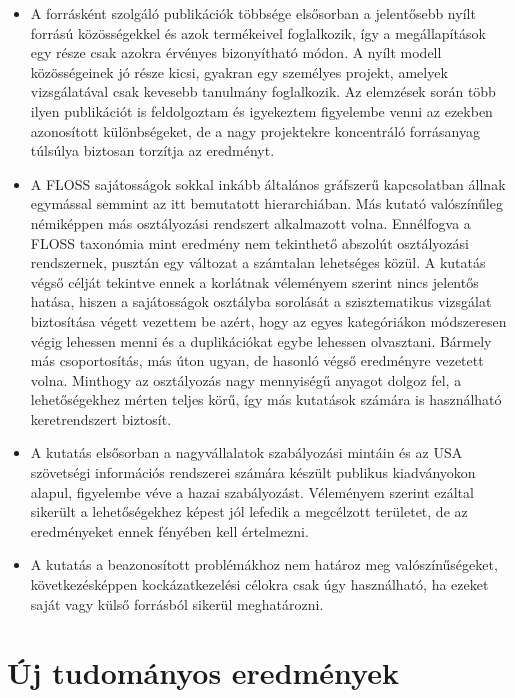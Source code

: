 \documentclass[12pt,magyar,a4paper,oneside]{scrreprt}
\begin{document}
\begin{itemize}
\item
  A forrásként szolgáló publikációk többsége elsősorban a jelentősebb
  nyílt forrású közösségekkel és azok termékeivel foglalkozik, így a
  megállapítások egy része csak azokra érvényes bizonyítható módon. A
  nyílt modell közösségeinek jó része kicsi, gyakran egy személyes
  projekt, amelyek vizsgálatával csak kevesebb tanulmány foglalkozik. Az
  elemzések során több ilyen publikációt is feldolgoztam és igyekeztem
  figyelembe venni az ezekben azonosított különbségeket, de a nagy
  projektekre koncentráló forrásanyag túlsúlya biztosan torzítja az
  eredményt.
\item
  A FLOSS sajátosságok sokkal inkább általános gráfszerű kapcsolatban
  állnak egymással semmint az itt bemutatott hierarchiában. Más kutató
  valószínűleg némiképpen más osztályozási rendszert alkalmazott volna.
  Ennélfogva a FLOSS taxonómia mint eredmény nem tekinthető abszolút
  osztályozási rendszernek, pusztán egy változat a számtalan lehetséges
  közül. A kutatás végső célját tekintve ennek a korlátnak véleményem
  szerint nincs jelentős hatása, hiszen a sajátosságok osztályba
  sorolását a szisztematikus vizsgálat biztosítása végett vezettem be
  azért, hogy az egyes kategóriákon módszeresen végig lehessen menni és
  a duplikációkat egybe lehessen olvasztani. Bármely más csoportosítás,
  más úton ugyan, de hasonló végső eredményre vezetett volna. Minthogy
  az osztályozás nagy mennyiségű anyagot dolgoz fel, a lehetőségekhez
  mérten teljes körű, így más kutatások számára is használható
  keretrendszert biztosít.
\item
  A kutatás elsősorban a nagyvállalatok szabályozási mintáin és az USA
  szövetségi információs rendszerei számára készült publikus
  kiadványokon alapul, figyelembe véve a hazai szabályozást. Véleményem
  szerint ezáltal sikerült a lehetőségekhez képest jól lefedik a
  megcélzott területet, de az eredményeket ennek fényében kell
  értelmezni.
\item
  A kutatás a beazonosított problémákhoz nem határoz meg
  valószínűségeket, következésképpen kockázatkezelési célokra csak úgy
  használható, ha ezeket saját vagy külső forrásból sikerül
  meghatározni.
\end{itemize}

\hypertarget{uxfaj-tudomuxe1nyos-eredmuxe9nyek}{%
\chapter{Új tudományos
eredmények}\label{uxfaj-tudomuxe1nyos-eredmuxe9nyek}}
\end{document}
